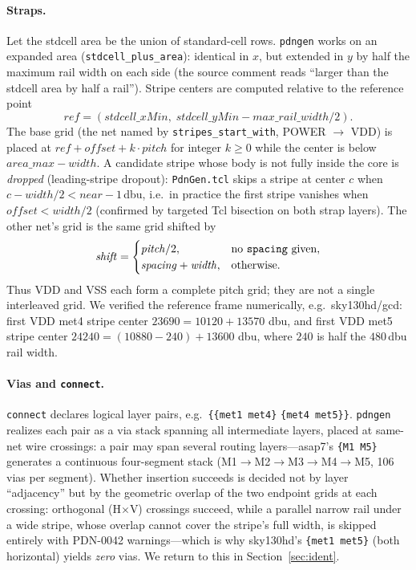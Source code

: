 \documentclass[11pt]{article}
\begin{document}
\paragraph{Straps.} Let the stdcell area be the union of standard-cell
rows.  \texttt{pdngen} works on an expanded area
(\texttt{stdcell\_plus\_area}): identical in $x$, but extended in $y$ by
half the maximum rail width on each side (the source comment reads
``larger than the stdcell area by half a rail'').  Stripe centers are
computed relative to the reference point
\begin{equation}
  \mathit{ref} = (\mathit{stdcell\_xMin},\;
  \mathit{stdcell\_yMin} - \mathit{max\_rail\_width}/2).
\end{equation}
The base grid (the net named by \texttt{stripes\_start\_with}, POWER
$\rightarrow$ VDD) is placed at $\mathit{ref} + \mathit{offset} + k\cdot
\mathit{pitch}$ for integer $k \geq 0$ while the center is below
$\mathit{area\_max} - \mathit{width}$.  A candidate stripe whose body is
not fully inside the core is \emph{dropped} (leading-stripe dropout):
\texttt{PdnGen.tcl} skips a stripe at center $c$ when
$c - \mathit{width}/2 < \mathit{near} - 1$\,dbu, i.e.\ in practice the
first stripe vanishes when $\mathit{offset} < \mathit{width}/2$
(confirmed by targeted Tcl bisection on both strap layers).  The other net's grid is the same
grid shifted by
\begin{equation}
  \mathit{shift} =
  \begin{cases}
    \mathit{pitch}/2, & \text{no \texttt{spacing} given},\\
    \mathit{spacing} + \mathit{width}, & \text{otherwise}.
  \end{cases}
\end{equation}
Thus VDD and VSS each form a complete pitch grid; they are not a single
interleaved grid.  We verified the reference frame numerically, e.g.\
sky130hd/gcd: first VDD met4 stripe center $23690 = 10120 + 13570$ dbu,
and first VDD met5 stripe center $24240 = (10880 - 240) + 13600$ dbu,
where $240$ is half the $480$\,dbu rail width.

\paragraph{Vias and \texttt{connect}.} \texttt{connect} declares logical
layer pairs, e.g.\ \texttt{\{\{met1 met4\}}
\texttt{\{met4 met5\}\}}.
\texttt{pdngen} realizes each pair as a via stack spanning all
intermediate layers, placed at same-net wire crossings: a pair may span
several routing layers---asap7's \texttt{\{M1 M5\}} generates a
continuous four-segment stack (M1$\to$M2$\to$M3$\to$M4$\to$M5, 106 vias
per segment).  Whether insertion succeeds is decided not by layer
``adjacency'' but by the geometric overlap of the two endpoint grids at
each crossing: orthogonal (H$\times$V) crossings succeed, while a
parallel narrow rail under a wide stripe, whose overlap cannot cover the
stripe's full width, is skipped entirely with PDN-0042 warnings---which
is why sky130hd's \texttt{\{met1 met5\}} (both horizontal) yields
\emph{zero} vias.  We return to this in Section~\ref{sec:ident}.
\end{document}
